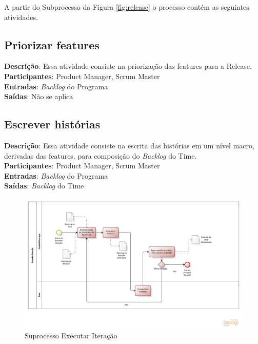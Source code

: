 A partir do Subprocesso da Figura \ref{fig:release} o processo contém as seguintes atividades.

\subsection{Priorizar features}
  \textbf{Descrição}: Essa atividade consiste na priorização das features para a Release. \\
  
  \textbf{Participantes}: Product Manager, Scrum Master\\
  
  \textbf{Entradas}: \textit{Backlog} do Programa \\
  
  \textbf{Saídas}:  Não se aplica\\

\subsection{Escrever histórias}
  \textbf{Descrição}: Essa atividade consiste na escrita das histórias em um nível macro, derivadas das features, para composição do \textit{Backlog} do Time. \\
  
  \textbf{Participantes}: Product Manager, Scrum Master\\
  
  \textbf{Entradas}: \textit{Backlog} do Programa \\
  
  \textbf{Saídas}:   \textit{Backlog} do Time \\

\begin{figure}[!htb]
\centering
\includegraphics[scale=0.5]{figuras/iteracao.png}
\caption{Suprocesso Executar Iteração}
\label{fig:iteracao}
\end{figure}

